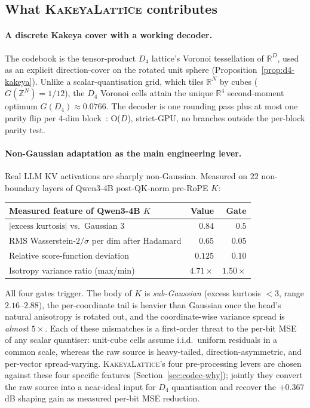 \documentclass[11pt,a4paper]{article}
\theoremstyle{definition}
\theoremstyle{plain}
\newcommand{\R}{\mathbb{R}}
\newcommand{\Z}{\mathbb{Z}}
\newcommand{\abs}[1]{\left\lvert#1\right\rvert}
\begin{document}
\subsection{What \textsc{KakeyaLattice} contributes}

\paragraph{A discrete Kakeya cover with a working decoder.}
The codebook is the tensor-product $D_4$ lattice's Voronoi
tessellation of $\R^D$, used as an explicit direction-cover on the
rotated unit sphere (Proposition~\ref{prop:d4-kakeya}). Unlike a
scalar-quantisation grid, which tiles $\R^N$ by cubes
($G(\Z^N) = 1/12$), the $D_4$ Voronoi cells attain the unique
$\R^4$ second-moment optimum $G(D_4) \approx 0.0766$. The decoder
is one rounding pass plus at most one parity flip per $4$-dim
block~\cite{conway-sloane-d4}: O($D$), strict-GPU, no branches
outside the per-block parity test.

\paragraph{Non-Gaussian adaptation as the main engineering lever.}
Real LLM KV activations are sharply non-Gaussian. Measured on
$22$ non-boundary layers of Qwen3-4B post-QK-norm pre-RoPE $K$:

\begin{center}
\begin{tabular}{lrr}
  \toprule
  Measured feature of Qwen3-4B $K$ & Value & Gate \\
  \midrule
  $\abs{\text{excess kurtosis}}$ vs.\ Gaussian $3$ & $0.84$ & $0.5$ \\
  RMS Wasserstein-$2/\sigma$ per dim after Hadamard & $0.65$ & $0.05$ \\
  Relative score-function deviation                 & $0.125$ & $0.10$ \\
  Isotropy variance ratio (max/min)                 & $4.71\times$ & $1.50\times$ \\
  \bottomrule
\end{tabular}
\end{center}

All four gates trigger. The body of $K$ is \emph{sub-Gaussian}
(excess kurtosis $< 3$, range $2.16$--$2.88$), the per-coordinate
tail is heavier than Gaussian once the head's natural anisotropy is
rotated out, and the coordinate-wise variance spread is
\emph{almost $5\times$}. Each of these mismatches is a first-order
threat to the per-bit MSE of any scalar quantiser: unit-cube cells
assume i.i.d.\ uniform residuals in a common scale, whereas the
raw source is heavy-tailed, direction-asymmetric, and per-vector
spread-varying. \textsc{KakeyaLattice}'s four pre-processing levers
are chosen against these four specific features
(Section~\ref{sec:codec-why}); jointly they convert the raw source
into a near-ideal input for $D_4$ quantisation and recover the
$+0.367\,$dB shaping gain as measured per-bit MSE reduction.
\end{document}
